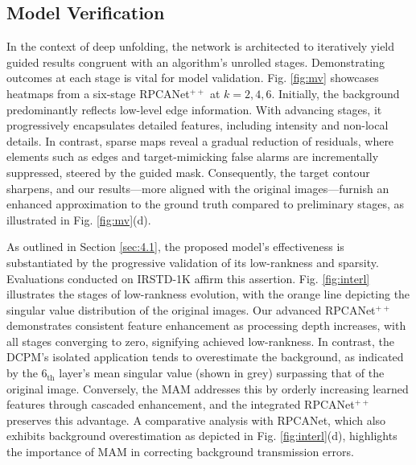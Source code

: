 \documentclass[10pt,journal,compsoc]{IEEEtran}
\begin{document}
\subsection{Model Verification}
In the context of deep unfolding, the network is architected to iteratively yield guided results congruent with an algorithm’s unrolled stages. Demonstrating outcomes at each stage is vital for model validation. Fig. \ref{fig:mv} showcases heatmaps from a six-stage RPCANet$^{++}$ at $k= 2,4,6$. Initially, the background predominantly reflects low-level edge information. With advancing stages, it progressively encapsulates detailed features, including intensity and non-local details. In contrast, sparse maps reveal a gradual reduction of residuals, where elements such as edges and target-mimicking false alarms are incrementally suppressed, steered by the guided mask. Consequently, the target contour sharpens, and our results—more aligned with the original images—furnish an enhanced approximation to the ground truth compared to preliminary stages, as illustrated in Fig. \ref{fig:mv}(d).


As outlined in Section \ref{sec:4.1}, the proposed model’s effectiveness is substantiated by the progressive validation of its low-rankness and sparsity. Evaluations conducted on IRSTD-1K \cite{zhang-2022-isnet} affirm this assertion. Fig. \ref{fig:interl} illustrates the stages of low-rankness evolution, with the orange line depicting the singular value distribution of the original images.
Our advanced RPCANet$^{++}$ demonstrates consistent feature enhancement as processing depth increases, with all stages converging to zero, signifying achieved low-rankness. In contrast, the DCPM’s isolated application tends to overestimate the background, as indicated by the 6$_{\text{th}}$ layer’s mean singular value (shown in grey) surpassing that of the original image. Conversely, the MAM addresses this by orderly increasing learned features through cascaded enhancement, and the integrated RPCANet$^{++}$ preserves this advantage. A comparative analysis with RPCANet, which also exhibits background overestimation as depicted in Fig. \ref{fig:interl}(d), highlights the importance of MAM in correcting background transmission errors.
\end{document}
